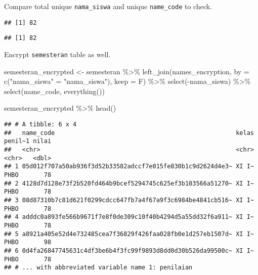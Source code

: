 \documentclass[
]{article}
\newenvironment{Shaded}{\begin{snugshade}}{\end{snugshade}}
\newcommand{\AttributeTok}[1]{\textcolor[rgb]{0.77,0.63,0.00}{#1}}
\newcommand{\FunctionTok}[1]{\textcolor[rgb]{0.00,0.00,0.00}{#1}}
\newcommand{\NormalTok}[1]{#1}
\newcommand{\OtherTok}[1]{\textcolor[rgb]{0.56,0.35,0.01}{#1}}
\newcommand{\SpecialCharTok}[1]{\textcolor[rgb]{0.00,0.00,0.00}{#1}}
\newcommand{\StringTok}[1]{\textcolor[rgb]{0.31,0.60,0.02}{#1}}
\begin{document}
Compare total unique \texttt{nama\_siswa} and unique \texttt{name\_code}
to check.

\begin{Shaded}
\end{Shaded}

\begin{verbatim}
## [1] 82
\end{verbatim}

\begin{Shaded}
\end{Shaded}

\begin{verbatim}
## [1] 82
\end{verbatim}

Encrypt \texttt{semesteran} table as well.

\begin{Shaded}
\begin{Highlighting}[]
\NormalTok{semesteran\_encrypted }\OtherTok{\textless{}{-}} 
\NormalTok{  semesteran }\SpecialCharTok{\%\textgreater{}\%} 
  \FunctionTok{left\_join}\NormalTok{(names\_encryption, }
            \AttributeTok{by =} \FunctionTok{c}\NormalTok{(}\StringTok{"nama\_siswa"} \OtherTok{=} \StringTok{"nama\_siswa"}\NormalTok{),}
            \AttributeTok{keep =}\NormalTok{ F) }\SpecialCharTok{\%\textgreater{}\%} 
  \FunctionTok{select}\NormalTok{(}\SpecialCharTok{{-}}\NormalTok{nama\_siswa) }\SpecialCharTok{\%\textgreater{}\%} 
  \FunctionTok{select}\NormalTok{(name\_code, }\FunctionTok{everything}\NormalTok{())}


\NormalTok{semesteran\_encrypted }\SpecialCharTok{\%\textgreater{}\%} \FunctionTok{head}\NormalTok{()}
\end{Highlighting}
\end{Shaded}

\begin{verbatim}
## # A tibble: 6 x 4
##   name_code                                                  kelas penil~1 nilai
##   <chr>                                                      <chr> <chr>   <dbl>
## 1 05d012f707a50ab936f3d52b33582adccf7e015fe830b1c9d2624d4e3~ XI I~ PHBO       78
## 2 4128d7d128e73f2b520fd464b9bcef5294745c625ef3b103566a51270~ XI I~ PHBO       78
## 3 08d87310b7c81d621f0299cdcc647fb7a4f67a9f3c6984be4841cb516~ XI I~ PHBO       78
## 4 adddc0a893fe566b9671f7e8f0de309c10f40b4294d5a55dd32f6a911~ XI I~ PHBO       78
## 5 a8921a405e52d4e732485cea7f36829f426faa028fb0e1d257eb1507d~ XI I~ PHBO       98
## 6 0d4fa26847745631c4df3be6b4f3fc99f9893d8dd0d30b526da99500c~ XI I~ PHBO       78
## # ... with abbreviated variable name 1: penilaian
\end{verbatim}
\end{document}
